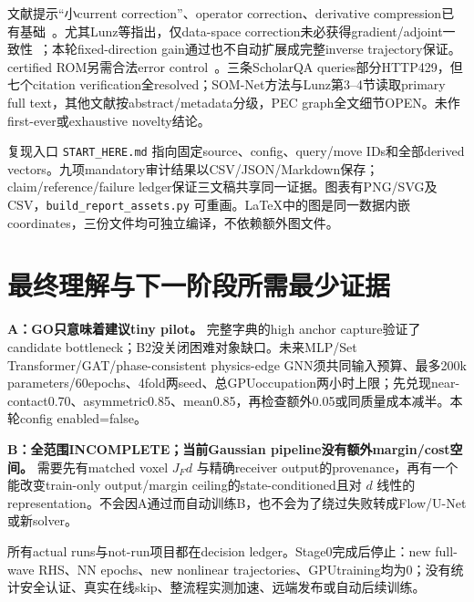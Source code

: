 \documentclass[UTF8,11pt,a4paper,fontset=fandol]{ctexart}
\newcommand{\code}[1]{\texttt{#1}}
\begin{document}
文献提示“小current correction”、operator correction、derivative compression已有基础~\cite{wei,som,lunz,dino,residual}。尤其Lunz等指出，仅data-space correction未必获得gradient/adjoint一致性~\cite{lunz}；本轮fixed-direction gain通过也不自动扩展成完整inverse trajectory保证。certified ROM另需合法error control~\cite{cert}。三条ScholarQA queries部分HTTP429，但七个citation verification全resolved；SOM-Net方法与Lunz第3--4节读取primary full text，其他文献按abstract/metadata分级，PEC graph全文细节OPEN。未作first-ever或exhaustive novelty结论。

复现入口 \code{START\_HERE.md} 指向固定source、config、query/move IDs和全部derived vectors。九项mandatory审计结果以CSV/JSON/Markdown保存；claim/reference/failure ledger保证三文稿共享同一证据。图表有PNG/SVG及CSV，\code{build\_report\_assets.py} 可重画。LaTeX中的图是同一数据内嵌coordinates，三份文件均可独立编译，不依赖额外图文件。

\section{最终理解与下一阶段所需最少证据}
\textbf{A：GO只意味着建议tiny pilot。} 完整字典的high anchor capture验证了candidate bottleneck；B2没关闭困难对象缺口。未来MLP/Set Transformer/GAT/phase-consistent physics-edge GNN须共同输入预算、最多200k parameters/60epochs、4fold两seed、总GPUoccupation两小时上限；先兑现near-contact0.70、asymmetric0.85、mean0.85，再检查额外0.05或同质量成本减半。本轮config enabled=false。

\textbf{B：全范围INCOMPLETE；当前Gaussian pipeline没有额外margin/cost空间。} 需要先有matched voxel $J_Fd$ 与精确receiver output的provenance，再有一个能改变train-only output/margin ceiling的state-conditioned且对 $d$ 线性的representation。不会因A通过而自动训练B，也不会为了绕过失败转成Flow/U-Net或新solver。

所有actual runs与not-run项目都在decision ledger。Stage0完成后停止：new full-wave RHS、NN epochs、new nonlinear trajectories、GPUtraining均为0；没有统计安全认证、真实在线skip、整流程实测加速、远端发布或自动后续训练。
\end{document}
